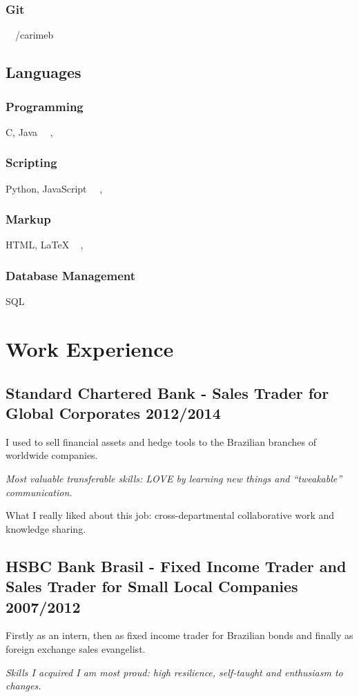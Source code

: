 \documentclass{article}
\begin{document}
\subsubsection{Git}
\faGithub \  \ /carimeb

\subsection{Languages}
\subsubsection{Programming}
C, Java\   \    ,  

\subsubsection{Scripting}
Python, JavaScript\   \    , 

\subsubsection{Markup}
HTML, {\LaTeX}   \    ,  

\subsubsection{Database Management}
SQL   \   

\section{Work Experience}
\subsection{Standard Chartered Bank - Sales Trader for Global Corporates \hfill 2012/2014}
I used to sell financial assets and hedge tools to the Brazilian branches of worldwide companies.

\emph{Most valuable transferable skills: LOVE by learning new things and ``tweakable'' communication.}

What I really liked about this job: cross-departmental collaborative work and knowledge sharing.

\subsection{HSBC Bank Brasil - Fixed Income Trader and Sales Trader for Small Local Companies \hfill 2007/2012}
Firstly as an intern, then as fixed income trader for Brazilian bonds and finally as foreign exchange sales evangelist.

\emph{Skills I acquired I am most proud: high resilience, self-taught and enthusiasm to changes.}
\end{document}
